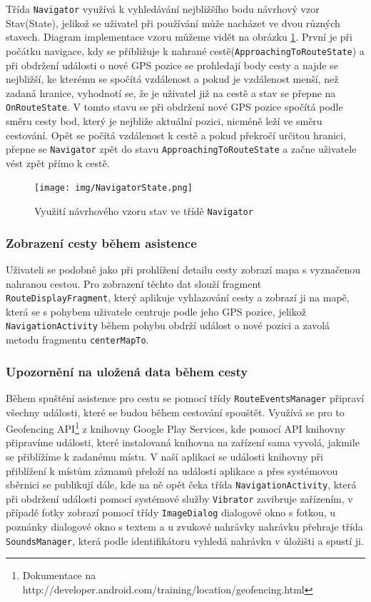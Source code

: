 \documentclass{article}
\begin{document}
Třída \texttt{Navigator} využívá k vyhledávání nejbližšího bodu návrhový vzor Stav(State), jelikož
se uživatel při používání může nacházet ve dvou různých stavech. Diagram implementace vzoru můžeme vidět
na obrázku \ref{fig:navigatorstate}. První je při počátku navigace,
kdy se přibližuje k nahrané cestě(\texttt{ApproachingToRouteState}) a při obdržení události o nové
GPS pozice se prohledají body cesty a najde se nejbližší, ke kterému se spočítá vzdálenost a pokud
je vzdálenost menší, než zadaná hranice, vyhodnotí se, že je uživatel již na cestě a stav se přepne
na \texttt{OnRouteState}.
V tomto stavu se při obdržení nové GPS pozice spočítá podle směru cesty bod, který je nejbliže aktuální pozici,
nicméně leží ve směru cestování. Opět se počítá vzdálenost k cestě a pokud překročí určitou hranici,
přepne se \texttt{Navigator} zpět do stavu \texttt{ApproachingToRouteState} a začne uživatele vést zpět přímo k cestě.

\begin{figure}[H]
        \centering
                \texttt{[image: img/NavigatorState.png]}
        \caption{Využití návrhového vzoru stav ve třídě \texttt{Navigator}}
        \label{fig:navigatorstate}
\end{figure}

\subsubsection{Zobrazení cesty během asistence}
Uživateli se podobně jako při prohlížení detailu cesty zobrazí mapa s vyznačenou nahranou cestou.
Pro zobrazení těchto dat slouží fragment \texttt{RouteDisplayFragment}, který aplikuje vyhlazování cesty
a zobrazí ji na mapě, která se s pohybem uživatele centruje podle jeho GPS pozice, jelikož
\texttt{NavigationActivity} během pohybu obdrží událost o nové pozici a zavolá metodu fragmentu \texttt{centerMapTo}.

\subsubsection{Upozornění na uložená data během cesty}
Během spuštění asistence pro cestu se pomocí třídy \texttt{RouteEventsManager} připraví všechny události,
které se budou během cestování spouštět. Využívá se pro to
Geofencing API\footnote{Dokumentace na http://developer.android.com/training/location/geofencing.html}
z knihovny Google Play Services, kde pomocí API knihovny připravíme události, které instalovaná knihovna
na zařízení sama vyvolá, jakmile se přiblížíme k zadanému místu. V naší aplikaci se události knihovny
při přiblížení k místům záznamů přeloží na události aplikace a přes systémovou sběrnici se publikují
dále, kde na ně opět čeka třída \texttt{NavigationActivity}, která při obdržení události pomocí
systémové služby \texttt{Vibrator} zavibruje zařízením, v případě fotky zobrazí pomocí třídy
\texttt{ImageDialog} dialogové okno s fotkou, u poznánky dialogové okno s textem a u zvukové nahrávky
nahrávku přehraje třída \texttt{SoundsManager}, která podle identifikátoru vyhledá nahrávku v úložišti
a spustí ji.
\end{document}
